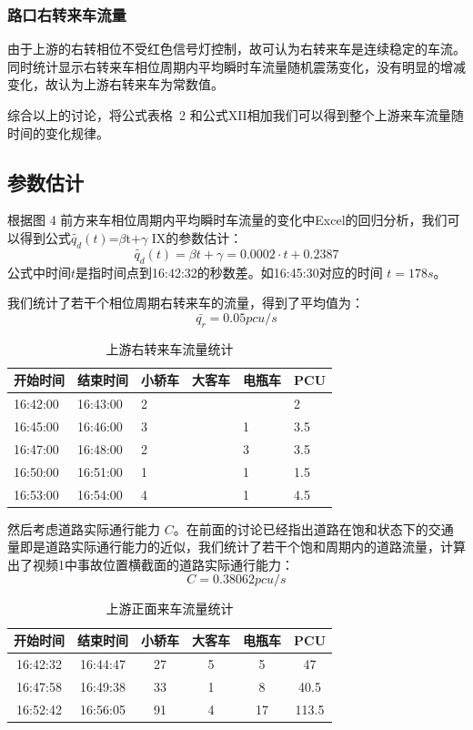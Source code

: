 \documentclass{cumcmart}
\begin{document}
\subsubsection{路口右转来车流量}

由于上游的右转相位不受红色信号灯控制，故可认为右转来车是连续稳定的车流。同时统计显示右转来车相位周期内平均瞬时车流量随机震荡变化，没有明显的增减变化，故认为上游右转来车为常数值。

综合以上的讨论，将公式表格~2 和公式XII相加我们可以得到整个上游来车流量随时间的变化规律。

\subsection{参数估计}
根据图 4
前方来车相位周期内平均瞬时车流量的变化中Excel的回归分析，我们可以得到公式$\tilde{q_{d}}\left(
 {t} \right)$=$\beta $t$+\gamma $ IX的参数估计：
\[
\tilde{q_{d}}\left( t \right)=\beta t+\gamma =0.0002\cdot  t+0.2387
\]
公式中时间$ {t}$是指时间点到16:42:32的秒数差。如16:45:30对应的时间
$ {t=178 s}$。

我们统计了若干个相位周期右转来车的流量，得到了平均值为：
\[
\bar{q_{r}}=0.05 pcu/s
\]
\begin{table}[h]
\centering
\begin{tabular}{|p{85pt}|l|l|l|l|l|}
\hline
{开始时间}& {结束时间}& {小轿车}& {大客车}& {电瓶车}& {PCU} \\
\hline
16:42:00& 16:43:00& 2& & & 2 \\
\hline
16:45:00& 16:46:00& 3& & 1& 3.5 \\
\hline
16:47:00& 16:48:00& 2& & 3& 3.5 \\
\hline
16:50:00& 16:51:00& 1& & 1& 1.5 \\
\hline
16:53:00& 16:54:00& 4& & 1& 4.5 \\
\hline
\end{tabular}
\caption{上游右转来车流量统计}
\label{tab13}
\end{table}

然后考虑道路实际通行能力
$C$。在前面的讨论已经指出道路在饱和状态下的交通量即是道路实际通行能力的近似，我们统计了若干个饱和周期内的道路流量，计算出了视频1中事故位置横截面的道路实际通行能力：
\[
C=0.38062 pcu/s
\]
\begin{table}[h]
\centering
\begin{tabular}{|c|c|c|c|c|c|}
\hline
\textbf{开始时间}& \textbf{结束时间}& \textbf{小轿车}& \textbf{大客车}& \textbf{电瓶车}& \textbf{PCU} \\
\hline
16:42:32& 16:44:47& 27& 5& 5& 47 \\
\hline
16:47:58& 16:49:38& 33& 1& 8& 40.5 \\
\hline
16:52:42& 16:56:05& 91& 4& 17& 113.5 \\
\hline
\end{tabular}
\caption{上游正面来车流量统计}\label{tab14}
\end{table}
\end{document}
